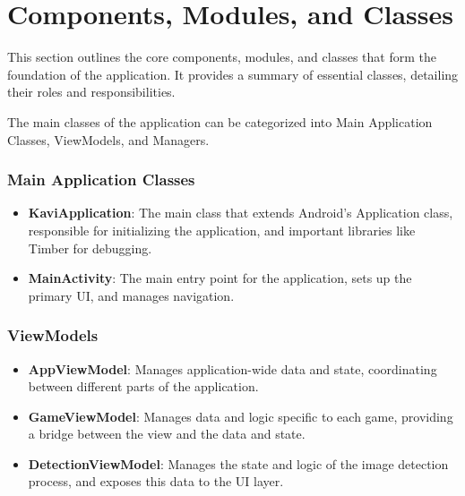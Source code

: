 \section{Components, Modules, and Classes}

This section outlines the core components, modules, and classes that form the foundation of the application. It provides a summary of essential classes, detailing their roles and responsibilities.

The main classes of the application can be categorized into Main Application Classes, ViewModels, and Managers.
\subsubsection{Main Application Classes}
\begin{itemize}
    \item \textbf{KaviApplication}: The main class that extends Android's Application class, responsible for initializing the application, and important libraries like Timber for debugging.
    \item \textbf{MainActivity}: The main entry point for the application, sets up the primary UI, and manages navigation.
\end{itemize}

\subsubsection{ViewModels}
\begin{itemize}
    \item \textbf{AppViewModel}: Manages application-wide data and state, coordinating between different parts of the application.
    \item \textbf{GameViewModel}: Manages data and logic specific to each game, providing a bridge between the view and the data and state.
    \item \textbf{DetectionViewModel}: Manages the state and logic of the image detection process, and exposes this data to the UI layer.
\end{itemize}

